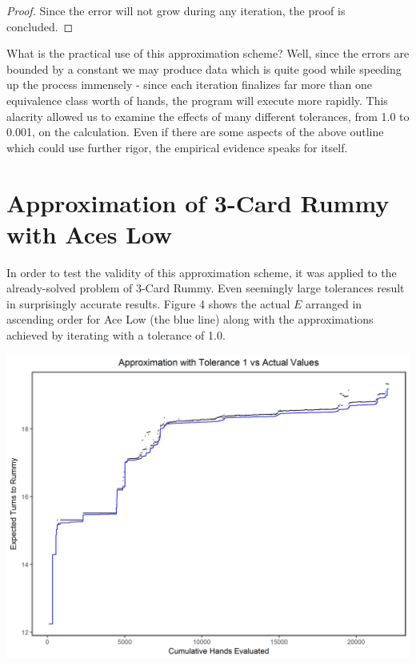 \documentclass[paper=a4, fontsize=11pt,twoside]{report}   %
\begin{document}
\begin{proof}
Since the error will not grow during any iteration, the proof is concluded.
\end{proof}

What is the practical use of this approximation scheme? Well, since the errors are bounded by a constant we may produce data which is quite good while speeding up the process immensely - since each iteration finalizes far more than one equivalence class worth of hands, the program will execute more rapidly. This alacrity allowed us to examine the effects of many different tolerances, from 1.0 to 0.001, on the calculation. Even if there are some aspects of the above outline which could use further rigor, the empirical evidence speaks for itself.
 
\section{Approximation of 3-Card Rummy with Aces Low}

In order to test the validity of this approximation scheme, it was applied to the already-solved problem of 3-Card Rummy. Even seemingly large tolerances result in surprisingly accurate results. Figure 4 shows the actual $E$ arranged in ascending order for Ace Low (the blue line) along with the approximations achieved by iterating with a tolerance of 1.0.

\includegraphics[width=\textwidth]{fig4.png}
\end{document}

